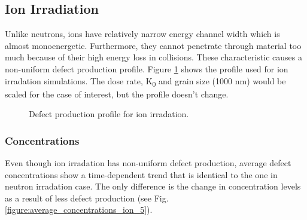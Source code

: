 \documentclass[a4paper]{article}
\begin{document}
  \newpage
  \subsection{Ion Irradiation} \hspace{10pt}
  Unlike neutrons, ions have relatively narrow energy channel width which is almost monoenergetic. Furthermore, they cannot penetrate through material too much because of their high energy loss in collisions. These characteristic causes a non-uniform defect production profile. Figure \ref{figure:defect_production} shows the profile used for ion irradation simulations. The dose rate, K\textsubscript{0} and grain size (1000 nm) would be scaled for the case of interest, but the profile doesn't change.
    \begin{figure}[h!]  %
      \centering
      \qquad
      \caption{Defect production profile for ion irradation.}
      \label{figure:defect_production}
    \end{figure}
    \subsubsection{Concentrations} \hspace{10pt}
    Even though ion irradation has non-uniform defect production, average defect concentrations show a time-dependent trend that is identical to the one in neutron irradation case. The only difference is the change in concentration levels as a result of less defect production (see Fig. \ref{figure:average_concentrations_ion_5}).
\end{document}
